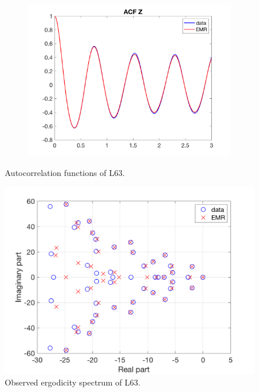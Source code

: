 \documentclass[12pt]{article}
\begin{document}
\begin{figure}[H]
\begin{subfigure}[b]{0.3\textwidth}
		\includegraphics[width=\textwidth]{plots/l63/acfzl63.png}
	\end{subfigure}
	\caption{Autocorrelation functions of L63.}
\end{figure}

\begin{figure}[H]
	\centering
	\includegraphics[width=\textwidth]{plots/l63/especl63.png}
	\caption{Observed ergodicity spectrum of L63.}
\end{figure}
\end{document}
